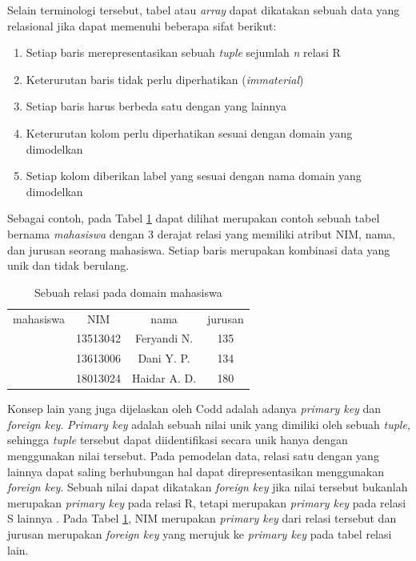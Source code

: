     Selain terminologi tersebut, tabel atau \textit{array} dapat dikatakan sebuah data yang relasional jika dapat memenuhi beberapa sifat berikut:

    \begin{enumerate}
        \item Setiap baris merepresentasikan sebuah \textit{tuple} sejumlah \textit{n} relasi R
        \item Keterurutan baris tidak perlu diperhatikan (\textit{immaterial})
        \item Setiap baris harus berbeda satu dengan yang lainnya
        \item Keterurutan kolom perlu diperhatikan sesuai dengan domain yang dimodelkan
        \item Setiap kolom diberikan label yang sesuai dengan nama domain yang dimodelkan
    \end{enumerate}

    Sebagai contoh, pada Tabel \ref{ContohTabel} dapat dilihat merupakan contoh sebuah tabel bernama \textit{mahasiswa} dengan 3 derajat relasi yang memiliki atribut NIM, nama, dan jurusan seorang mahasiswa. Setiap baris merupakan kombinasi data yang unik dan tidak berulang.

    \begin{table}[htb]
        \caption{Sebuah relasi pada domain mahasiswa}
        \label{ContohTabel}
        \begin{center}
            \begin{tabular}{ l c c c }
                \hline
                mahasiswa & NIM & nama & jurusan \\
                & 13513042 & Feryandi N. & 135 \\
                & 13613006 & Dani Y. P. & 134 \\
                & 18013024 & Haidar A. D. & 180 \\
                \hline
            \end{tabular}
        \end{center}
    \end{table}

    Konsep lain yang juga dijelaskan oleh Codd adalah adanya \textit{primary key} dan \textit{foreign key}. \textit{Primary key} adalah sebuah nilai unik yang dimiliki oleh sebuah \textit{tuple}, sehingga \textit{tuple} tersebut dapat diidentifikasi secara unik hanya dengan menggunakan nilai tersebut. Pada pemodelan data, relasi satu dengan yang lainnya dapat saling berhubungan hal dapat direpresentasikan menggunakan \textit{foreign key}. Sebuah nilai dapat dikatakan \textit{foreign key} jika nilai tersebut bukanlah merupakan \textit{primary key} pada relasi R, tetapi merupakan \textit{primary key} pada relasi S lainnya \parencite{codd1970relational}. Pada Tabel \ref{ContohTabel}, NIM merupakan \textit{primary key} dari relasi tersebut dan jurusan merupakan \textit{foreign key} yang merujuk ke \textit{primary key} pada tabel relasi lain.

